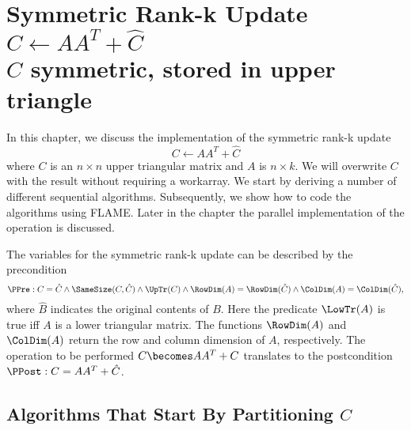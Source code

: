 %
%


\chapter{Symmetric Rank-k Update \\
$ C \leftarrow A A^T + \hat{C} $ \\
$ C $ symmetric, stored in upper triangle
}
\label{chapter:syrk_un}





In this chapter, we discuss the implementation of the symmetric rank-k update
\[
C \leftarrow A A^T + \hat{C}
\]
where $ C $ is an $ n \times n $ upper triangular matrix and $ A $ is
$ n \times k $.  We will overwrite $ C $ with the result without
requiring a workarray.  We start by deriving a number of different
sequential algorithms.  Subsequently, we show how to code the
algorithms using FLAME.  Later in the chapter the parallel
implementation of the operation is discussed.

The variables for the symmetric rank-k update can be
described by the precondition
\[
\PPre:
C = \hat{C} \wedge \SameSize( C, \hat{C} ) \wedge \UpTr( C ) \wedge
\RowDim( A )=\RowDim(\hat{C}) \wedge \ColDim( A )=\ColDim(\hat{C}),
\]
where $ \hat{B} $ indicates the original contents of $ B $.  Here the
predicate $ \LowTr( A ) $ is true iff $ A $ is a lower triangular
matrix.  The functions $ \RowDim( A ) $ and $ \ColDim( A ) $ return
the row and column dimension of $ A $, respectively.  The operation to
be performed $ C \becomes A A^T + C $ translates to the postcondition $
\PPost: C = A A^T + \hat{C} $.

\section{Algorithms That Start By Partitioning $ C $}
\label{sec:trmm_lln:L}

